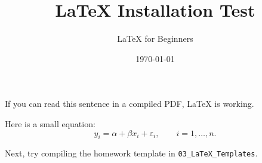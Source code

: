 \documentclass{article}
\title{LaTeX Installation Test}
\author{LaTeX for Beginners}
\date{\today}
\begin{document}
\maketitle

If you can read this sentence in a compiled PDF, LaTeX is working.

Here is a small equation:
\[
  y_i = \alpha + \beta x_i + \varepsilon_i,
  \qquad i=1,\ldots,n.
\]

Next, try compiling the homework template in
\texttt{03\_LaTeX\_Templates}.
\end{document}

